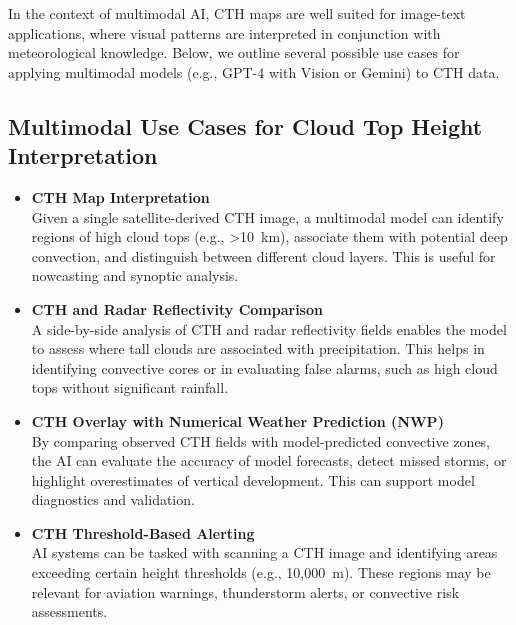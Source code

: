In the context of multimodal AI, CTH maps are well suited for image-text applications, where visual patterns are interpreted in conjunction with meteorological knowledge. Below, we outline several possible use cases for applying multimodal models (e.g., GPT-4 with Vision or Gemini) to CTH data.

%
\subsection{Multimodal Use Cases for Cloud Top Height Interpretation}

\begin{itemize}
    \item \textbf{CTH Map Interpretation} \\
    Given a single satellite-derived CTH image, a multimodal model can identify regions of high cloud tops (e.g., >10~km), associate them with potential deep convection, and distinguish between different cloud layers. This is useful for nowcasting and synoptic analysis.

    \item \textbf{CTH and Radar Reflectivity Comparison} \\
    A side-by-side analysis of CTH and radar reflectivity fields enables the model to assess where tall clouds are associated with precipitation. This helps in identifying convective cores or in evaluating false alarms, such as high cloud tops without significant rainfall.

    \item \textbf{CTH Overlay with Numerical Weather Prediction (NWP)} \\
    By comparing observed CTH fields with model-predicted convective zones, the AI can evaluate the accuracy of model forecasts, detect missed storms, or highlight overestimates of vertical development. This can support model diagnostics and validation.

    \item \textbf{CTH Threshold-Based Alerting} \\
    AI systems can be tasked with scanning a CTH image and identifying areas exceeding certain height thresholds (e.g., 10,000~m). These regions may be relevant for aviation warnings, thunderstorm alerts, or convective risk assessments.


\end{itemize}
